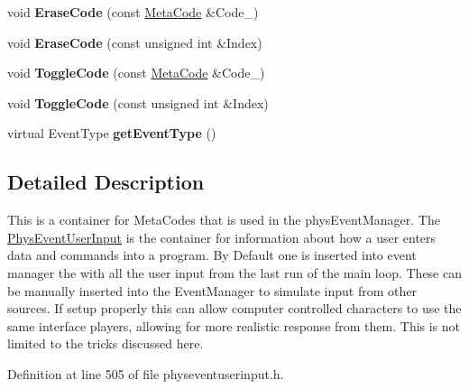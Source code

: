 \begin{DoxyCompactItemize}
\item 
\hypertarget{classPhysEventUserInput_a1dbd2996770df334fba9f67d9bb4ffa0}{
void {\bfseries EraseCode} (const \hyperlink{classMetaCode}{MetaCode} \&Code\_\-)}
\label{dc/d0e/classPhysEventUserInput_a1dbd2996770df334fba9f67d9bb4ffa0}

\item 
\hypertarget{classPhysEventUserInput_a8cbbee3c2be3bd12746ad442fce526e4}{
void {\bfseries EraseCode} (const unsigned int \&Index)}
\label{dc/d0e/classPhysEventUserInput_a8cbbee3c2be3bd12746ad442fce526e4}

\item 
\hypertarget{classPhysEventUserInput_a8325bb0172db6ea02fd06f4a5d1a7378}{
void {\bfseries ToggleCode} (const \hyperlink{classMetaCode}{MetaCode} \&Code\_\-)}
\label{dc/d0e/classPhysEventUserInput_a8325bb0172db6ea02fd06f4a5d1a7378}

\item 
\hypertarget{classPhysEventUserInput_a2e8e56d7e25deaf0e5f9672a780489a2}{
void {\bfseries ToggleCode} (const unsigned int \&Index)}
\label{dc/d0e/classPhysEventUserInput_a2e8e56d7e25deaf0e5f9672a780489a2}

\item 
\hypertarget{classPhysEventUserInput_a7adabb15e8012a86c9da1910033eea4b}{
virtual EventType {\bfseries getEventType} ()}
\label{dc/d0e/classPhysEventUserInput_a7adabb15e8012a86c9da1910033eea4b}

\end{DoxyCompactItemize}


\subsection{Detailed Description}
This is a container for MetaCodes that is used in the physEventManager. The \hyperlink{classPhysEventUserInput}{PhysEventUserInput} is the container for information about how a user enters data and commands into a program. By Default one is inserted into event manager the with all the user input from the last run of the main loop. These can be manually inserted into the EventManager to simulate input from other sources. If setup properly this can allow computer controlled characters to use the same interface players, allowing for more realistic response from them. This is not limited to the tricks discussed here. 

Definition at line 505 of file physeventuserinput.h.

